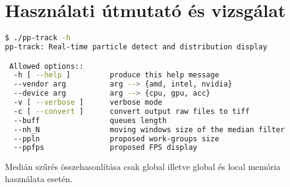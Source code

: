 \chapter{Használati útmutató és vizsgálat}
\begin{lstlisting}[language=bash]
$ ./pp-track -h
pp-track: Real-time particle detect and distribution display

 Allowed options::
  -h [ --help ]         produce this help message
  --vendor arg          arg --> {amd, intel, nvidia}
  --device arg          arg --> {cpu, gpu, acc}
  -v [ --verbose ]      verbose mode
  -c [ --convert ]      convert output raw files to tiff
  --buff                queues length
  --nh_N                moving windows size of the median filter
  --ppln                proposed work-groups size
  --ppfps               proposed FPS display 
\end{lstlisting}
Medián szűrés összehasonlítása csak global illetve global és local memória használata esetén.
